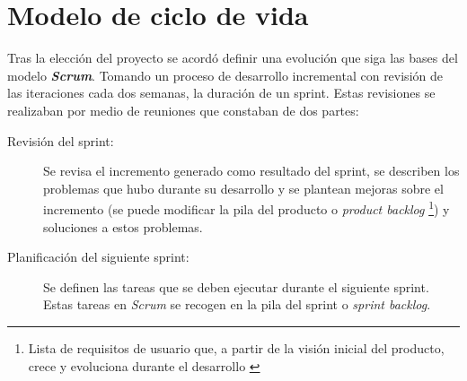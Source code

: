 \section{Modelo de ciclo de vida}

Tras la elección del proyecto se acordó definir una evolución que siga las bases del modelo \textit{\textbf{Scrum}}. Tomando un proceso de desarrollo incremental con revisión de las iteraciones cada dos semanas, la duración de un sprint. Estas revisiones se realizaban por medio de reuniones que constaban de dos partes:
\begin{description}
	\item [Revisión del sprint:] Se revisa el incremento generado como resultado del sprint, se describen los problemas que hubo durante su desarrollo y se plantean mejoras sobre el incremento (se puede modificar la pila del producto o \textit{product backlog} \footnote{Lista de requisitos de usuario que, a partir de la visión inicial del producto, crece y evoluciona durante el desarrollo \cite{noauthor_scrum_2019}}) y soluciones a estos problemas.
	\item [Planificación del siguiente sprint:] Se definen las tareas que se deben ejecutar durante el siguiente sprint. Estas tareas en \textit{Scrum} se recogen en la pila del sprint o \textit{sprint backlog}.
\end{description}

